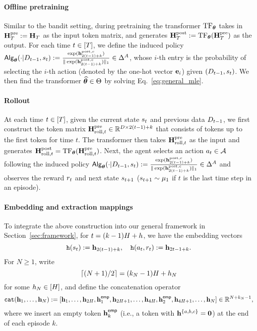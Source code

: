 \paragraph{Offline pretraining} 
Similar to the bandit setting, during
pretraining the transformer ${\rm TF}_{{\boldsymbol \theta}}$ takes in   ${\mathbf H}_{T}^{\mathrm{pre}}:={\mathbf H}_{T}$ as the input token matrix, and generates ${\mathbf H}_{T}^{\mathrm{post}}:={\rm TF}_{{\boldsymbol \theta}}({\mathbf H}_{T}^{\mathrm{pre}})$ as the output. For each time $t\in[{T}]$, we define the  induced policy  ${\mathsf{Alg}}_{{\boldsymbol \theta}}(\cdot|{D}_{t-1},{s}_t):=\frac{\exp({\mathbf h}^{{\mathrm{post}},{c}}_{2(t-1)+k})}{\|\exp({\mathbf h}^{{\mathrm{post}},{c}}_{2(t-1)+k})\|_1}\in\Delta^{A}$, whose $i$-th entry is the probability of selecting the $i$-th action (denoted by the  one-hot vector ${\mathbf e}_i$) given $({D}_{t-1},{s}_t)$. We then find the transformer ${\widehat{{\boldsymbol \theta}}}\in{\Theta}$ by solving Eq.~\eqref{eq:general_mle}. 

\paragraph{Rollout}
At each time $t\in[{T}]$, given the  current state ${s}_t$ and  previous data ${D}_{t-1}$, we first construct the token matrix ${\mathbf H}^{{\mathrm{pre}}}_{{\mathrm{roll}},t}\in\mathbb{R}^{D\times 2(t-1)+k}$ that consists of tokens up to the first token for time $t$.   The transformer then takes ${\mathbf H}^{{\mathrm{pre}}}_{{\mathrm{roll}},t}$ as the input  and generates ${\mathbf H}^{{\mathrm{post}}}_{{\mathrm{roll}},t}={\rm TF}_{{\boldsymbol \theta}}({\mathbf H}^{{\mathrm{pre}}}_{{\mathrm{roll}},t})$. Next,  the agent selects an action ${a}_t\in{\mathcal{A}}$ following  the induced  policy ${\mathsf{Alg}}_{{\boldsymbol \theta}}(\cdot|{D}_{t-1},{s}_t):=\frac{\exp({\mathbf h}^{{\mathrm{post}},{c}}_{2(t-1)+k})}{\|\exp({\mathbf h}^{{\mathrm{post}},{c}}_{2(t-1)+k})\|_1}\in\Delta^{A}$ and observes the reward ${r}_t$ and next state ${s}_{t+1}$ (${s}_{t+1}\sim{\mu_1}$ if $t$ is the last time step in an episode).





\paragraph{Embedding and extraction mappings}
To integrate the above construction into our general framework in Section~\ref{sec:framework}, for $t=(k-1){H}+h$,  we have the embedding vectors $${\tt h}({s}_t):={\mathbf h}_{2(t-1)+k},~~~{\tt h}({a}_t,{r}_t):={\mathbf h}_{2t-1+k}.$$  For $N\geq 1$, write $$\lceil(N+1)/2\rceil=(k_N-1){H}+h_N$$ for some $h_N\in[{H}]$, and define the  concatenation operator 
\begin{align*}
{\tt cat}({\mathbf h}_1, \ldots, {\mathbf h}_N): = [{\mathbf h}_1, \ldots,{\mathbf h}_{2{H}},{\mathbf h}_{1}^{{\mathsf{emp}}}, {\mathbf h}_{2{H}+1},\ldots,{\mathbf h}_{4{H}},{\mathbf h}_2^{\mathsf{emp}},{\mathbf h}_{4{H}+1},\ldots, {\mathbf h}_N]\in\mathbb{R}^{N+k_N-1},
\end{align*}
where we insert an empty token ${\mathbf h}_k^{\mathsf{emp}}$ (i.e., a token with ${\mathbf h}^{\{{a},{b},{c}\}}={\mathbf 0}$) at the end of  each episode $k$. 

